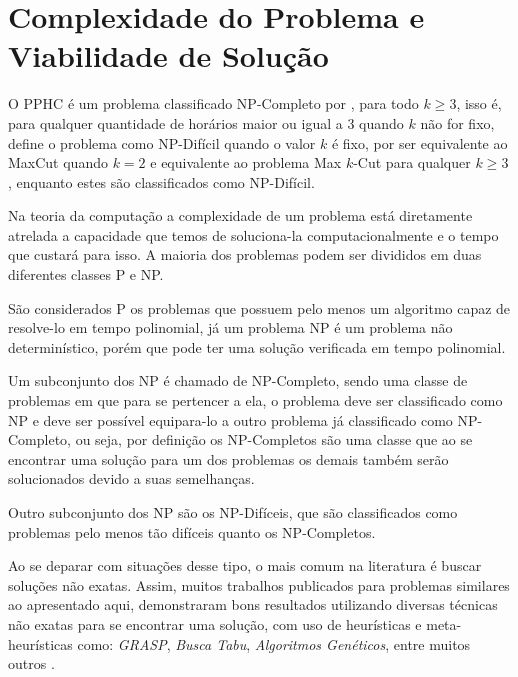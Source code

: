 \section{Complexidade do Problema e Viabilidade de Solução}

O PPHC é um problema classificado NP-Completo por , para todo $k \geq 3$, isso é, para qualquer quantidade de horários maior ou igual a $3$ quando $k$ não for fixo,  define o problema como NP-Difícil quando o valor $k$ é fixo, por ser equivalente ao MaxCut quando $k = 2$ e equivalente ao problema Max $k$-Cut para qualquer $k \geq 3$, enquanto estes são classificados como NP-Difícil.  




Na teoria da computação a complexidade de um problema está diretamente atrelada a capacidade que temos de soluciona-la computacionalmente e o tempo que custará para isso. A maioria dos problemas podem ser divididos em duas diferentes classes P e NP. 

São considerados P os problemas que possuem pelo menos um algoritmo capaz de resolve-lo em tempo polinomial, já um problema NP é um problema não determinístico, porém que pode ter uma solução verificada em tempo polinomial.

Um subconjunto dos NP é chamado de NP-Completo, sendo uma classe de problemas em que para se pertencer a ela, o problema deve ser classificado como NP e deve ser possível equipara-lo a outro problema já classificado como NP-Completo, ou seja, por definição os NP-Completos são uma classe que ao se encontrar uma solução para um dos problemas os demais também serão solucionados devido a suas semelhanças.

Outro subconjunto dos NP são os NP-Difíceis, que são classificados como problemas pelo menos tão difíceis quanto os NP-Completos.



Ao se deparar com situações desse tipo, o mais comum na literatura é buscar soluções não exatas. Assim, muitos trabalhos publicados para problemas similares ao apresentado aqui, demonstraram bons resultados utilizando diversas técnicas não exatas para se encontrar uma solução, com uso de heurísticas e meta-heurísticas como: \textit{GRASP}, \textit{Busca Tabu}, \textit{Algoritmos Genéticos}, entre muitos outros \cite{rocha13}.

